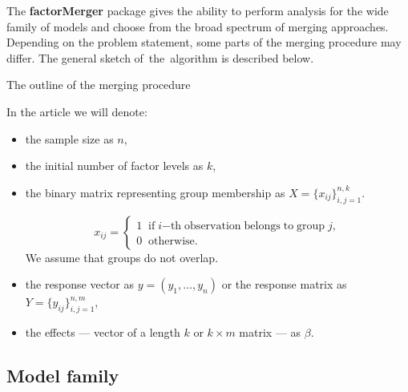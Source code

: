 \documentclass[12pt]{article}
\newcommand{\factorMerger}{\textbf{factorMerger }}
\begin{document}
The \factorMerger package gives the ability to perform analysis for the wide family of models and choose from the broad spectrum of merging approaches. Depending on the problem statement, some parts of the merging procedure may differ. The general sketch of~the~algorithm is described below.

\begin{algorithm}[H]
\caption{The outline of the merging procedure}
\label{outline}
\begin{algorithmic}[2]

\EndWhile
    \EndFunction
\end{algorithmic}
\end{algorithm}

In the article we will denote:
\begin{itemize}

\item the sample size as $n$,
\item the initial number of factor levels as $k$,
\item the binary matrix representing group membership as $X = \{x_{ij}\}_{i,j=1}^{n,k}$. 

$$
x_{ij} = \left\{
                \begin{array}{ll}
                  1\;\; \mathrm{if} \; i \mathrm{-th \;
                  observation \; belongs \; to 
                  \; group\;} j, \\
                  0 \;\; \mathrm{otherwise.} 
                \end{array}
       \right.$$
We assume that groups do not overlap.
\item the response vector as $y = (y_1, \ldots, y_n)$ or the response matrix as $Y = \{y_{ij}\}_{i,j=1}^{n,m}$,
\item the effects --- vector of a length $k$  or $k \times m$ matrix --- as $\beta$.

\end{itemize}

\subsection{Model family}
\end{document}
